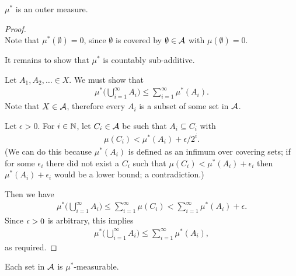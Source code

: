 \begin{claim*}
  $\mu^*$ is an outer measure.
\end{claim*}

\begin{proof}~\\
  Note that $\mu^*(\emptyset) = 0$, since $\emptyset$ is covered by $\emptyset \in \mathcal A$ with $\mu(\emptyset) = 0$.

  It remains to show that $\mu^*$ is countably sub-additive.

  Let $A_1, A_2, \ldots \in X$. We must show that
  \begin{align*}
    \mu^*\Big(\bigcup_{i=1}^\infty A_i\Big) \leq \sum_{i=1}^\infty \mu^*(A_i).
  \end{align*}
  Note that $X \in \mathcal A$, therefore every $A_i$ is a subset of some set in $\mathcal A$.

  Let $\epsilon > 0$. For $i \in \mathbb{N}$, let $C_i \in \mathcal A$ be such that $A_i \subseteq C_{i}$ with
  \begin{align*}
    \mu(C_{i}) < \mu^*(A_i) + \epsilon/2^i.
  \end{align*}
  (We can do this because $\mu^*(A_i)$ is defined as an infimum over covering sets; if for some $\epsilon_i$
  there did not exist a $C_i$ such that $\mu(C_{i}) < \mu^*(A_i) + \epsilon_i$ then $\mu^*(A_i) + \epsilon_i$
  would be a lower bound; a contradiction.)

  Then we have
  \begin{align*}
    \mu^*\Big(\bigcup_{i=1}^\infty A_i\Big) \leq \sum_{i=1}^\infty \mu(C_{i}) < \sum_{i=1}^\infty \mu^*(A_i) + \epsilon.
  \end{align*}
  Since $\epsilon > 0$ is arbitrary, this implies
  \begin{align*}
    \mu^*\Big(\bigcup_{i=1}^\infty A_i\Big) \leq \sum_{i=1}^\infty \mu^*(A_i),
  \end{align*}
  as required.
\end{proof}

\begin{claim*}
  Each set in $\mathcal A$ is $\mu^*$-measurable.
\end{claim*}

